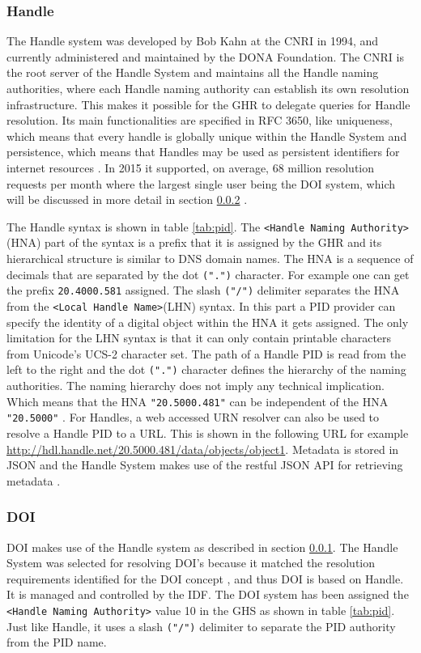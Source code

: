 \subsubsection{Handle}\label{hndl}
The Handle system was developed by Bob Kahn at the CNRI in 1994, and currently administered and maintained by the DONA Foundation. The CNRI is the root server of the Handle System and maintains all the Handle naming authorities, where each Handle naming authority can establish its own resolution infrastructure. This makes it possible for the GHR to delegate queries for Handle resolution. 
Its main functionalities are specified in RFC 3650, like uniqueness, which means that every handle is globally unique within the Handle System and persistence, which means that Handles may be used as persistent identifiers for internet resources \cite{rfc3650}. In 2015 it supported, on average, 68 million resolution requests per month where the largest single user being the DOI system, which will be discussed in more detail in section \ref{doi} \cite{hdl-us}. 

The Handle syntax is shown in table \ref{tab:pid}. The \texttt{\textless Handle Naming Authority\textgreater} (HNA) part of the syntax is a prefix that it is assigned by the GHR and its hierarchical structure is similar to DNS domain names. The HNA is a sequence of decimals that are separated by the dot \texttt{(".")} character. For example one can get the prefix \texttt{20.4000.581} assigned. The slash \texttt{("/")} delimiter separates the HNA from the \texttt{\textless Local Handle Name\textgreater}(LHN) syntax. In this part a PID provider can specify the identity of a digital object within the HNA it gets assigned. The only limitation for the LHN syntax is that it can only contain printable characters from Unicode's UCS-2 character set. The path of a Handle PID is read from the left to the right and the dot \texttt{(".")} character defines the hierarchy of the naming authorities. The naming hierarchy does not imply any technical implication. Which means that the HNA \texttt{"20.5000.481"} can be independent of the HNA \texttt{"20.5000"} \cite{icn-bd}. For Handles, a web accessed URN resolver can also be used to resolve a Handle PID to a URL. This is shown in the following URL for example \url{http://hdl.handle.net/20.5000.481/data/objects/object1}. Metadata is stored in JSON and the Handle System makes use of the restful JSON API for retrieving metadata \cite{hdl-api}.

\subsubsection{DOI}\label{doi}
DOI makes use of the Handle system as described in section \ref{hndl}. The Handle System was selected for resolving DOI's because it matched the resolution requirements identified for the DOI concept \cite{doi-found}, and thus DOI is based on Handle. It is managed and controlled by the IDF. The DOI system has been assigned the \texttt{<Handle Naming Authority>} value 10 in the GHS as shown in table \ref{tab:pid}. Just like Handle, it uses a slash \texttt{("/")} delimiter to separate the PID authority from the PID name.

